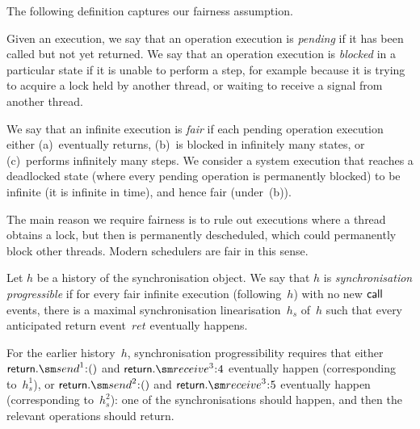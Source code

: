 The following definition captures our fairness assumption.
%
\begin{definition}
Given an execution, we say that an operation execution is \emph{pending} if it
has been called but not yet returned.  We say that an operation execution is
\emph{blocked} in a particular state if it is unable to perform a step, for
example because it is trying to acquire a lock held by another thread, or
waiting to receive a signal from another thread.

We say that an infinite execution is \emph{fair} if each pending operation
execution either (a)~eventually returns, (b)~is blocked in infinitely many
states, or (c)~performs infinitely many steps.  We consider a system execution
that reaches a deadlocked state (where every pending operation is permanently
blocked) to be infinite (it is infinite in time), and hence fair (under~(b)).
\end{definition}

The main reason we require fairness is to rule out executions where a thread
obtains a lock, but then is permanently descheduled, which could permanently
block other threads.  Modern schedulers are fair in this sense.


\begin{definition}
Let $h$ be a history of the synchronisation object.  We say that $h$ is
\emph{synchronisation progressible} if for every fair infinite execution
(following~$h$) with no new $\mathsf{call}$ events, there is a maximal synchronisation
linearisation~$h_s$ of~$h$ such that every anticipated return event~$ret$
eventually happens.
\end{definition}





For the earlier history~$h$, synchronisation progressibility
requires that either $\return.\send^1\::()$ and $\return.\receive^3\::4$
eventually happen (corresponding to~$h_s^1$), or $\return.\send^2\::()$ and
$\return.\receive^3\::5$ eventually happen (corresponding to~$h_s^2$): one of
the synchronisations should happen, and then the relevant operations should
return. 


